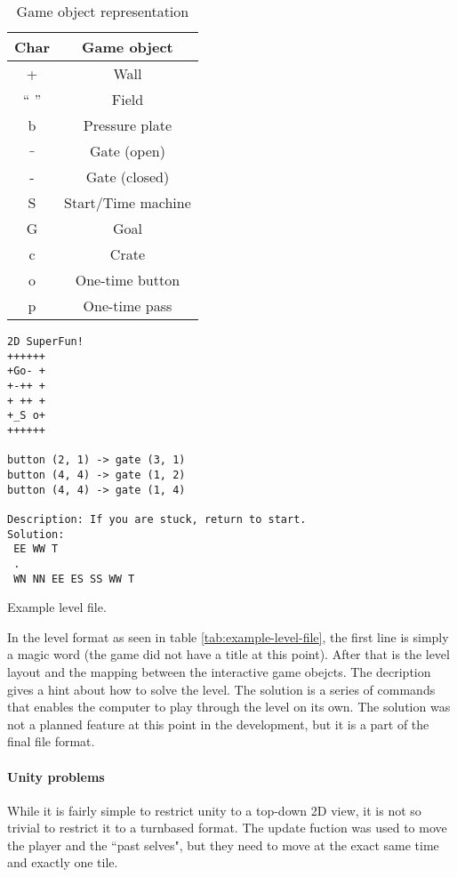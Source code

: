 \begin{table}
\begin{tabular}{|c|c|}
\hline
Char & Game object\\
\hline
+ & Wall\\
`` '' & Field\\
b & Pressure plate\\
$\_$ & Gate (open)\\
- & Gate (closed)\\
S & Start/Time machine\\
G & Goal\\
c & Crate\\
o & One-time button\\
p & One-time pass\\
\hline
\end{tabular}
\caption{Game object representation}
\label{tab:game-object-representation}
\end{table}

\begin{table}
\begin{verbatim}
2D SuperFun!
++++++
+Go- +
+-++ +
+ ++ +
+_S o+
++++++

button (2, 1) -> gate (3, 1)
button (4, 4) -> gate (1, 2)
button (4, 4) -> gate (1, 4)

Description: If you are stuck, return to start.
Solution:
 EE WW T
 .
 WN NN EE ES SS WW T
\end{verbatim}
\caption{Example level file.}
\label{tab:example-level-file}
\end{table}

In the level format as seen in table \ref{tab:example-level-file}, the first line
is simply a magic word (the game did not have a title at this point). After that
is the level layout and the mapping between the interactive game obejcts.
The decription gives a hint about how to solve the level. The solution is a
series of commands that enables the computer to play through the level on
its own. The solution was not a planned feature at this point in the
development, but it is a part of the final file format.

\paragraph{Unity problems}
While it is fairly simple to restrict unity to a top-down 2D view, it
is not so trivial to restrict it to a turnbased format. The update
fuction was used to move the player and the ``past selves", but they need
to move at the exact same time and exactly one tile.


